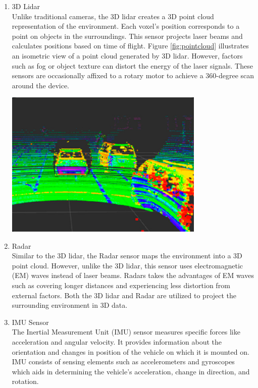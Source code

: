 \documentclass[12pt,twoside,a4paper,parskip]{scrbook} %
\begin{document}
\begin{enumerate}[label=\alph*.]
    \item 3D Lidar \\
    Unlike traditional cameras, the 3D lidar creates a 3D point cloud representation of the environment. Each voxel's position corresponds to a point on objects in the surroundings. This sensor projects laser beams and calculates positions based on time of flight. Figure \ref{fig:pointcloud} \cite{senimage} illustrates an isometric view of a point cloud generated by 3D lidar. However, factors such as fog or object texture can distort the energy of the laser signals. These sensors are occasionally affixed to a rotary motor to achieve a 360-degree scan around the device.
    \begin{minipage}[t]{\linewidth}
        \centering
        \includegraphics[width=0.75\textwidth]{Images/Lidardata.png}
        \label{fig:pointcloud}
        \vspace{-\baselineskip} %
    \end{minipage}
    \hfill
    
    \item Radar \\
    Similar to the 3D lidar, the Radar sensor maps the environment into a 3D point cloud. However, unlike the 3D lidar, this sensor uses electromagnetic (EM) waves instead of laser beams. Radars takes the advantages of EM waves such as covering longer distances and experiencing less distortion from external factors. Both the 3D lidar and Radar are utilized to project the surrounding environment in 3D data.
    
    \item IMU Sensor \\
    The Inertial Measurement Unit (IMU) sensor measures specific forces like acceleration and angular velocity. It provides information about the orientation and changes in position of the vehicle on which it is mounted on. IMU consists of sensing elements such as accelerometers and gyroscopes which aids in determining the vehicle's acceleration, change in direction, and rotation.


\end{enumerate}
\end{document}
